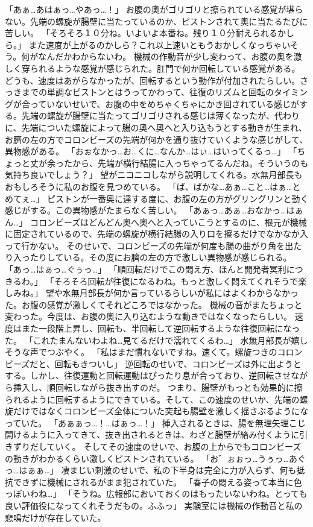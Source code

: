 「あぁ…あはぁっ…やあっ…！」
お腹の奥がゴリゴリと擦られている感覚が堪らない。先端の螺旋が腸壁に当たっているのか、ピストンされて奥に当たるたびに苦しい。
「そろそろ１０分ね。いよいよ本番ね。残り１０分耐えられるかしら。」
また速度が上がるのかしら？これ以上速いともうおかしくなっちゃいそう。何がなんだかわからないわ。
機械の作動音が少し変わって、お腹の奥を激しく穿られるような感覚が感じられた。肛門で何か回転している感覚がある。
どうも、速度はあがらなかったが、回転するという動作が付加されたらしい。さっきまでの単調なピストンとはうってかわって、往復のリズムと回転のタイミングが合っていないせいで、お腹の中をめちゃくちゃにかき回されている感じがする。先端の螺旋が腸壁に当たってゴリゴリされる感じは薄くなったが、代わりに、先端についた螺旋によって腸の奥へ奥へと入り込もうとする動きが生まれ、お臍の左の方でコロンビーズの先端が何かを通り抜けていくような感じがして、異物感がある。
「おぉなかっ…お…くに…なんか…はぃ…はいってくるっ…」
「ちょっと丈が余ったから、先端が横行結腸に入っちゃってるんだね。そういうのも気持ち良いでしょう？」
望がニコニコしながら説明してくれる。水無月部長もおもしろそうに私のお腹を見つめている。
「ば、ばかな…あぁ…こと…はぁ…とめてぇ…」
ピストンが一番奥に達する度に、お腹の左の方がグリングリンと動く感じがする。この異物感がたまらなく苦しい。
「あぁっ…あぁ…おなかっ…はぁん…」
コロンビーズはどんどん奥へ奥へと入っていこうとするのに、根元が機械に固定されているので、先端の螺旋が横行結腸の入り口を擦るだけでなかなか入って行かない。
そのせいで、コロンビーズの先端が何度も腸の曲がり角を出たり入ったりしている。その度にお臍の左の方で激しい異物感が感じられる。
「あっ…はぁっ…ぐぅっ…」
「順回転だけでこの悶え方、ほんと開発者冥利につきるわ。」
「そろそろ回転が往復になるわね。もっと激しく悶えてくれそうで楽しみね。」
望や水無月部長が何か言っているらしいが私にはよくわからなかった。お腹の感覚が激しくてそれどころではなかった。
機械の音がまたちょっと変わった。今度は、お腹の奥に入り込むような動きではなくなったらしい。
速度はまた一段階上昇し、回転も、半回転して逆回転するような往復回転になった。
「これたまんないわよね…見てるだけで濡れてくるわ…」
水無月部長が嬉しそうな声でつぶやく。
「私はまだ慣れないですね。速くて。螺旋つきのコロンビーズだと、回転もきついし」
逆回転のせいで、コロンビーズは外に出ようとする。しかし、往復運動と回転運動はぴったり息が合っており、逆回転させながら挿入し、順回転しながら抜き出すのだ。
つまり、腸壁がもっとも効果的に擦られるように回転するようにできている。そして、この速度のせいか、先端の螺旋だけではなくコロンビーズ全体についた突起も腸壁を激しく揺さぶるようになっていた。
「あぁぁっ…！…はぁっ…！」
挿入されるときは、腸を無理矢理こじ開けるように入ってきて、抜き出されるときは、わざと腸壁が絡み付くように引きずりだしていく。
そしてその速度のせいで、お腹の上からでもコロンビーズの動きがわかるくらい激しくピストンされている。
「お゛ぉぉっ…うぅっ…あぐっ…はぁぁ…」
凄まじい刺激のせいで、私の下半身は完全に力が入らず、何も抵抗できずに機械にされるがまま犯されていた。
「春子の悶える姿って本当に色っぽいわね…」
「そうね。広報部においておくのはもったいないわね。とっても良い評価役になってくれそうだもの。ふふっ」
実験室には機械の作動音と私の悲鳴だけが存在していた。


